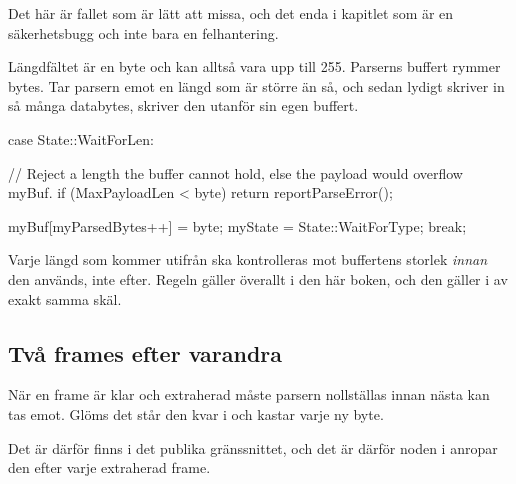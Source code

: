 Det här är fallet som är lätt att missa, och det enda i kapitlet som är en säkerhetsbugg och inte
bara en felhantering.

Längdfältet är en byte och kan alltså vara upp till 255. Parserns buffert rymmer
 bytes. Tar parsern emot en längd som är större än så, och sedan lydigt
skriver in så många databytes, skriver den utanför sin egen buffert.

\begin{cppcode}
case State::WaitForLen:
{
    // Reject a length the buffer cannot hold, else the payload would overflow myBuf.
    if (MaxPayloadLen < byte) { return reportParseError(); }

    myBuf[myParsedBytes++] = byte;
    myState                = State::WaitForType;
    break;
}
\end{cppcode}

\begin{aside}
\note[Regel] Varje längd som kommer utifrån ska kontrolleras mot buffertens storlek \emph{innan}
den används, inte efter. Regeln gäller överallt i den här boken, och den gäller
 i  av exakt samma skäl.
\end{aside}

\subsection{Två frames efter varandra}

När en frame är klar och extraherad måste parsern nollställas innan nästa kan tas emot. Glöms det
står den kvar i  och kastar varje ny byte.

Det är därför  finns i det publika gränssnittet, och det är därför noden i
 anropar den efter varje extraherad frame.
